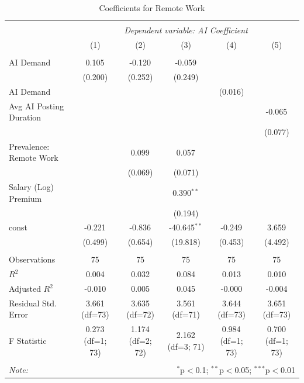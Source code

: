 \begin{table}[!htbp] \centering
  \caption{Coefficients for Remote Work}
\begin{tabular}{@{\extracolsep{5pt}}lccccc}
\\[-1.8ex]\hline
\hline \\[-1.8ex]
& \multicolumn{5}{c}{\textit{Dependent variable: AI Coefficient}} \
\cr \cline{2-6}
\\[-1.8ex] & (1) & (2) & (3) & (4) & (5) \\
\hline \\[-1.8ex]
 AI Demand & 0.105$^{}$ & -0.120$^{}$ & -0.059$^{}$ & & \\
& (0.200) & (0.252) & (0.249) & & \\
 AI Demand %
& & & & (0.016) & \\
 Avg AI Posting Duration & & & & & -0.065$^{}$ \\
& & & & & (0.077) \\
 Prevalence: Remote Work & & 0.099$^{}$ & 0.057$^{}$ & & \\
& & (0.069) & (0.071) & & \\
 Salary (Log) Premium & & & 0.390$^{**}$ & & \\
& & & (0.194) & & \\
 const & -0.221$^{}$ & -0.836$^{}$ & -40.645$^{**}$ & -0.249$^{}$ & 3.659$^{}$ \\
& (0.499) & (0.654) & (19.818) & (0.453) & (4.492) \\
\hline \\[-1.8ex]
 Observations & 75 & 75 & 75 & 75 & 75 \\
 $R^2$ & 0.004 & 0.032 & 0.084 & 0.013 & 0.010 \\
 Adjusted $R^2$ & -0.010 & 0.005 & 0.045 & -0.000 & -0.004 \\
 Residual Std. Error & 3.661 (df=73) & 3.635 (df=72) & 3.561 (df=71) & 3.644 (df=73) & 3.651 (df=73) \\
 F Statistic & 0.273$^{}$ (df=1; 73) & 1.174$^{}$ (df=2; 72) & 2.162$^{}$ (df=3; 71) & 0.984$^{}$ (df=1; 73) & 0.700$^{}$ (df=1; 73) \\
\hline
\hline \\[-1.8ex]
\textit{Note:} & \multicolumn{5}{r}{$^{*}$p$<$0.1; $^{**}$p$<$0.05; $^{***}$p$<$0.01} \\
\end{tabular}
\end{table}